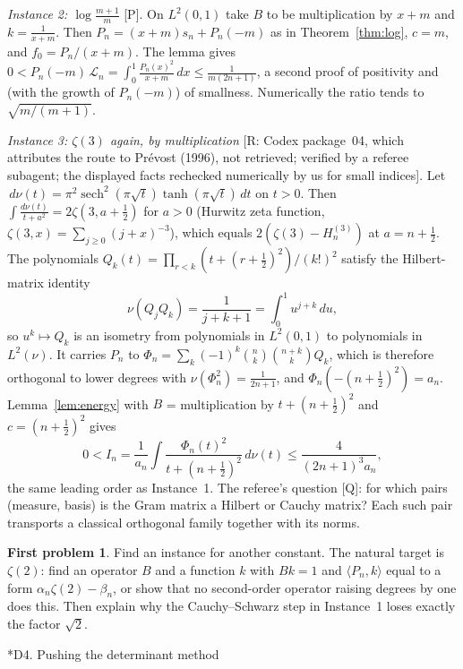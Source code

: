 \documentclass[11pt,a4paper]{article}
\makeatletter
\newcommand{\dd}{\,d}
\newcommand{\st}[1]{\textsf{[#1]}}
\theoremstyle{definition}
\newtheorem*{problem}{First problem}
\renewcommand\section{\@startsection{section}{1}{\z@}{-2.2ex plus -.6ex minus -.2ex}{1.1ex plus .2ex}{\normalfont\large\bfseries}}
\makeatother
\begin{document}
\emph{Instance 2: $\log\frac{m+1}m$} \st{P}. On $L^2(0,1)$ take $B$ to be multiplication by $x+m$ and
$k=\frac1{x+m}$. Then $P_n=(x+m)s_n+P_n(-m)$ as in Theorem~\ref{thm:log}, $c=m$, and
$f_0=P_n/(x+m)$. The lemma gives
$0<P_n(-m)\,\mathcal L_n=\int_0^1\frac{P_n(x)^2}{x+m}\dd x\le\frac1{m(2n+1)}$, a second proof of positivity
and (with the growth of $P_n(-m)$) of smallness. Numerically the ratio tends to $\sqrt{m/(m+1)}$.

\emph{Instance 3: $\zeta(3)$ again, by multiplication} \st{R: Codex package~04, which attributes the
route to Pr\'evost (1996), not retrieved; verified by a referee subagent; the displayed facts
rechecked numerically by us for small indices}. Let $\dd\nu(t)=\pi^2\operatorname{sech}^2(\pi\sqrt t)\tanh(\pi\sqrt t)\dd t$
on $t>0$. Then $\int\frac{d\nu(t)}{t+a^2}=2\zeta(3,a+\frac12)$ for $a>0$ (Hurwitz zeta function, $\zeta(3,x)=\sum_{j\ge0}(j+x)^{-3}$), which equals
$2(\zeta(3)-H_n^{(3)})$ at $a=n+\frac12$. The polynomials
$Q_k(t)=\prod_{r<k}(t+(r+\frac12)^2)/(k!)^2$ satisfy the Hilbert-matrix identity
\[
\nu(Q_jQ_k)=\frac1{j+k+1}=\int_0^1u^{j+k}\dd u ,
\]
so $u^k\mapsto Q_k$ is an isometry from polynomials in $L^2(0,1)$ to polynomials in $L^2(\nu)$. It
carries $P_n$ to $\Phi_n=\sum_k(-1)^k\binom nk\binom{n+k}kQ_k$, which is therefore orthogonal to
lower degrees with $\nu(\Phi_n^2)=\frac1{2n+1}$, and $\Phi_n(-(n+\frac12)^2)=a_n$. Lemma~\ref{lem:energy}
with $B$ = multiplication by $t+(n+\frac12)^2$ and $c=(n+\frac12)^2$ gives
\[
0<I_n=\frac1{a_n}\int\frac{\Phi_n(t)^2}{t+(n+\frac12)^2}\dd\nu(t)\le\frac4{(2n+1)^3a_n},
\]
the same leading order as Instance~1. The referee's question \st{Q}: for which pairs (measure, basis) is the Gram
matrix a Hilbert or Cauchy matrix? Each such pair transports a classical orthogonal family together
with its norms.

\begin{problem}
Find an instance for another constant. The natural target is $\zeta(2)$: find an operator $B$ and a function $k$
with $Bk=1$ and $\langle P_n,k\rangle$ equal to a form $\alpha_n\zeta(2)-\beta_n$, or show that no
second-order operator raising degrees by one does this. Then explain why the
Cauchy--Schwarz step in Instance~1 loses exactly the factor $\sqrt2$.
\end{problem}

\section*{D4. Pushing the determinant method}
\end{document}
